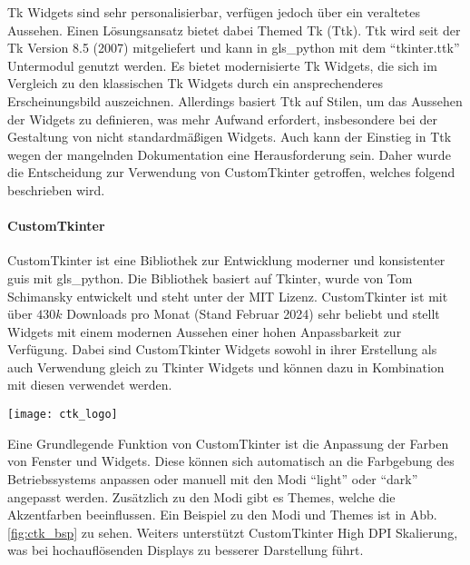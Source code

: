 Tk Widgets sind sehr personalisierbar, verfügen jedoch über ein veraltetes Aussehen. Einen Lösungsansatz bietet dabei Themed Tk (Ttk). Ttk wird seit der Tk Version 8.5 (2007) mitgeliefert und kann in \gls{gls_python} mit dem \enquote{tkinter.ttk} Untermodul genutzt werden. Es bietet modernisierte Tk Widgets, die sich im Vergleich zu den klassischen Tk Widgets durch ein ansprechenderes Erscheinungsbild auszeichnen. Allerdings basiert Ttk  auf Stilen, um das Aussehen der Widgets zu definieren, was mehr Aufwand erfordert, insbesondere bei der Gestaltung von nicht standardmäßigen Widgets. Auch kann der Einstieg in Ttk wegen der mangelnden Dokumentation eine Herausforderung sein. Daher wurde die Entscheidung zur Verwendung von CustomTkinter getroffen, welches folgend beschrieben wird. \cite[vgl.][]{Python_Software_Foundation_Tk:o.J., stackoverflow_tk_ttk:2013}


\paragraph{CustomTkinter}
\begin{minipage}{0.6\textwidth}
	CustomTkinter ist eine Bibliothek zur Entwicklung moderner und konsistenter \acsp{gui} mit \gls{gls_python}. Die Bibliothek basiert auf Tkinter, wurde von Tom Schimansky entwickelt und steht unter der MIT Lizenz. CustomTkinter ist mit über $430k$ Downloads pro Monat (Stand Februar 2024) sehr beliebt und stellt Widgets mit einem modernen Aussehen einer hohen Anpassbarkeit zur Verfügung. Dabei sind CustomTkinter Widgets sowohl in ihrer Erstellung als auch Verwendung gleich zu Tkinter Widgets und können dazu in Kombination mit diesen verwendet werden. \cite[vgl.][]{Schimansky_Git:o.J.}
\end{minipage}%
\hfill
\begin{minipage}{0.37\textwidth}
	\centering	
	\texttt{[image: ctk\_logo]}
\end{minipage}
\vspace{1ex}

Eine Grundlegende Funktion von CustomTkinter ist die Anpassung der Farben von Fenster und Widgets. Diese können sich automatisch an die Farbgebung des Betriebssystems anpassen oder manuell mit den Modi \enquote{light} oder \enquote{dark} angepasst werden. Zusätzlich zu den Modi gibt es Themes, welche die Akzentfarben beeinflussen. Ein Beispiel zu den Modi und Themes ist in Abb. \ref{fig:ctk_bsp} zu sehen. Weiters unterstützt CustomTkinter High DPI Skalierung, was bei hochauflösenden Displays zu besserer Darstellung führt. \cite[vgl.][]{Schimansky_Git:o.J.}

